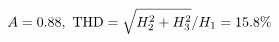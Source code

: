 \documentclass[preview]{standalone}
\begin{document}
\begin{align*}
\special{dvisvgm:raw <g id='unique000'>}A=0.88,\ \text{THD}=\sqrt{H_2^2+H_3^2}/H_1=15.8\%\special{dvisvgm:raw </g>}
\end{align*}
\end{document}

